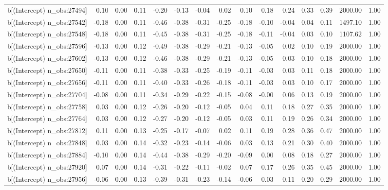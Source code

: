 \begin{table}[ht]
\begin{tabular}{rrrrrrrrrrrrrrr}
  b[(Intercept) n\_obs:27494] & 0.10 & 0.00 & 0.11 & -0.20 & -0.13 & -0.04 & 0.02 & 0.10 & 0.18 & 0.24 & 0.33 & 0.39 & 2000.00 & 1.00 \\ 
  b[(Intercept) n\_obs:27542] & -0.18 & 0.00 & 0.11 & -0.46 & -0.38 & -0.31 & -0.25 & -0.18 & -0.10 & -0.04 & 0.04 & 0.11 & 1497.10 & 1.00 \\ 
  b[(Intercept) n\_obs:27548] & -0.18 & 0.00 & 0.11 & -0.45 & -0.38 & -0.31 & -0.25 & -0.18 & -0.11 & -0.04 & 0.03 & 0.10 & 1107.62 & 1.00 \\ 
  b[(Intercept) n\_obs:27596] & -0.13 & 0.00 & 0.12 & -0.49 & -0.38 & -0.29 & -0.21 & -0.13 & -0.05 & 0.02 & 0.10 & 0.19 & 2000.00 & 1.00 \\ 
  b[(Intercept) n\_obs:27602] & -0.13 & 0.00 & 0.12 & -0.46 & -0.38 & -0.29 & -0.21 & -0.13 & -0.05 & 0.03 & 0.10 & 0.18 & 2000.00 & 1.00 \\ 
  b[(Intercept) n\_obs:27650] & -0.11 & 0.00 & 0.11 & -0.38 & -0.33 & -0.25 & -0.19 & -0.11 & -0.03 & 0.03 & 0.11 & 0.18 & 2000.00 & 1.00 \\ 
  b[(Intercept) n\_obs:27656] & -0.11 & 0.00 & 0.11 & -0.40 & -0.33 & -0.26 & -0.18 & -0.11 & -0.03 & 0.03 & 0.10 & 0.17 & 2000.00 & 1.00 \\ 
  b[(Intercept) n\_obs:27704] & -0.08 & 0.00 & 0.11 & -0.34 & -0.29 & -0.22 & -0.15 & -0.08 & -0.00 & 0.06 & 0.13 & 0.19 & 2000.00 & 1.00 \\ 
  b[(Intercept) n\_obs:27758] & 0.03 & 0.00 & 0.12 & -0.26 & -0.20 & -0.12 & -0.05 & 0.04 & 0.11 & 0.18 & 0.27 & 0.35 & 2000.00 & 1.00 \\ 
  b[(Intercept) n\_obs:27764] & 0.03 & 0.00 & 0.12 & -0.27 & -0.20 & -0.12 & -0.05 & 0.03 & 0.11 & 0.19 & 0.26 & 0.34 & 2000.00 & 1.00 \\ 
  b[(Intercept) n\_obs:27812] & 0.11 & 0.00 & 0.13 & -0.25 & -0.17 & -0.07 & 0.02 & 0.11 & 0.19 & 0.28 & 0.36 & 0.47 & 2000.00 & 1.00 \\ 
  b[(Intercept) n\_obs:27848] & 0.03 & 0.00 & 0.14 & -0.32 & -0.23 & -0.14 & -0.06 & 0.03 & 0.13 & 0.21 & 0.30 & 0.40 & 2000.00 & 1.00 \\ 
  b[(Intercept) n\_obs:27884] & -0.10 & 0.00 & 0.14 & -0.44 & -0.38 & -0.29 & -0.20 & -0.09 & 0.00 & 0.08 & 0.18 & 0.27 & 2000.00 & 1.00 \\ 
  b[(Intercept) n\_obs:27920] & 0.07 & 0.00 & 0.14 & -0.31 & -0.22 & -0.11 & -0.02 & 0.07 & 0.17 & 0.26 & 0.35 & 0.45 & 2000.00 & 1.00 \\ 
  b[(Intercept) n\_obs:27956] & -0.06 & 0.00 & 0.13 & -0.39 & -0.31 & -0.23 & -0.14 & -0.06 & 0.03 & 0.11 & 0.20 & 0.29 & 2000.00 & 1.00 \\ 

\end{tabular}
\end{table}
